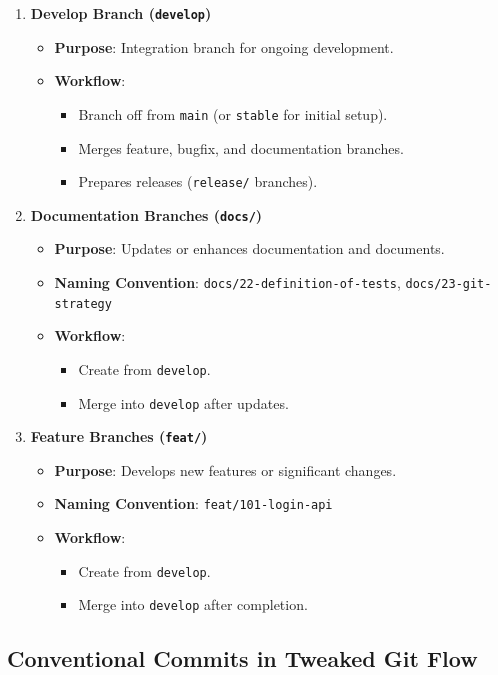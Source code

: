 \begin{enumerate}
	\item \textbf{Develop Branch (\texttt{develop})}
	\begin{itemize}
		\item \textbf{Purpose}: Integration branch for ongoing development.
		\item \textbf{Workflow}:
		\begin{itemize}
			\item Branch off from \texttt{main} (or \texttt{stable} for initial setup).
			\item Merges feature, bugfix, and documentation branches.
			\item Prepares releases (\texttt{release/} branches).
		\end{itemize}
	\end{itemize}
	
	\item \textbf{Documentation Branches (\texttt{docs/})}
	\begin{itemize}
		\item \textbf{Purpose}: Updates or enhances documentation and documents.
		\item \textbf{Naming Convention}: \texttt{docs/22-definition-of-tests}, \texttt{docs/23-git-strategy}
		\item \textbf{Workflow}:
		\begin{itemize}
			\item Create from \texttt{develop}.
			\item Merge into \texttt{develop} after updates.
		\end{itemize}
	\end{itemize}
	
	\item \textbf{Feature Branches (\texttt{feat/})}
	\begin{itemize}
		\item \textbf{Purpose}: Develops new features or significant changes.
		\item \textbf{Naming Convention}: \texttt{feat/101-login-api}
		\item \textbf{Workflow}:
		\begin{itemize}
			\item Create from \texttt{develop}.
			\item Merge into \texttt{develop} after completion.
		\end{itemize}
	\end{itemize}
\end{enumerate}

\subsection{Conventional Commits in Tweaked Git Flow}

